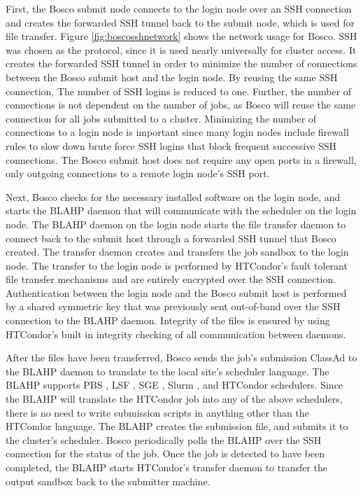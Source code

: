 First, the Bosco submit node connects to the login node over an SSH connection and creates the forwarded SSH tunnel back to the submit node, which is used for file transfer.  Figure \ref{fig:boscosshnetwork} shows the network usage for Bosco.  SSH was chosen as the protocol, since it is used nearly universally for cluster access.  It creates the forwarded SSH tunnel in order to minimize the number of connections between the Bosco submit host and the login node.  By reusing the same SSH connection, The number of SSH logins is reduced to one.  Further, the number of connections is not dependent on the number of jobs, as Bosco will reuse the same connection for all jobs submitted to a cluster.  Minimizing the number of connections to a login node is important since many login nodes include firewall rules to slow down brute force SSH logins that block frequent successive SSH connections.  The Bosco submit host does not require any open ports in a firewall, only outgoing connections to a remote login node's SSH port.



Next, Bosco checks for the necessary installed software on the login node, and starts the BLAHP \cite{blahp} daemon that will communicate with the scheduler on the login node.  The BLAHP daemon on the login node starts the file transfer daemon to connect back to the submit host through a forwarded SSH tunnel that Bosco created.  The transfer daemon creates and transfers the job sandbox to the login node.  The transfer to the login node is performed by HTCondor's fault tolerant file transfer mechanisms and are entirely encrypted over the SSH connection.  Authentication between the login node and the Bosco submit host is performed by a shared symmetric key that was previously sent out-of-band over the SSH connection to the BLAHP daemon.  Integrity of the files is ensured by using HTCondor's built in integrity checking of all communication between daemons.

After the files have been transferred, Bosco sends the job's submission ClassAd \cite{raman1998matchmaking} to the BLAHP daemon to translate to the local site's scheduler language.  The BLAHP supports PBS \cite{computing2013torque}, LSF \cite{computinglsf}, SGE \cite{gentzsch2001sun}, Slurm \cite{yoo2003slurm}, and HTCondor schedulers.  Since the BLAHP will translate the HTCondor job into any of the above schedulers, there is no need to write submission scripts in anything other than the HTCondor language.  The BLAHP creates the submission file, and submits it to the cluster's scheduler.  Bosco periodically polls the BLAHP over the SSH connection for the status of the job.  Once the job is detected to have been completed, the BLAHP starts HTCondor's transfer daemon to transfer the output sandbox back to the submitter machine.

